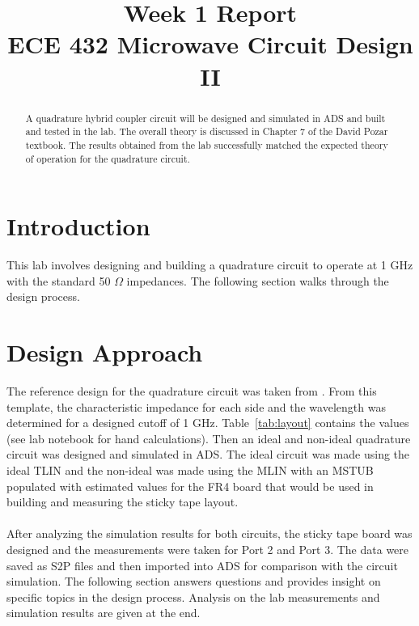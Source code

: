 \documentclass[conference]{IEEEtran}
\begin{document}
\title{Week 1 Report\\ECE 432 Microwave Circuit Design II}

\author{
\and
{}
}
\maketitle


\begin{abstract}
A quadrature hybrid coupler circuit will be designed and simulated in ADS and built and tested in the lab.  The overall theory is discussed in Chapter 7 of the David Pozar textbook.  The results obtained from the lab successfully matched the expected theory of operation for the quadrature circuit.
\end{abstract}
\IEEEpeerreviewmaketitle


\section{Introduction}
This lab involves designing and building a quadrature circuit to operate at 1 GHz with the standard 50 $\Omega$ impedances.  The following section walks through the design process.
\section{Design Approach}
The reference design for the quadrature circuit was taken from \cite{IEEEhowto:kopka}.  From this template, the characteristic impedance for each side and the wavelength was determined for a designed cutoff of 1 GHz.  Table~\ref{tab:layout} contains the values (see lab notebook for hand calculations).  Then an ideal and non-ideal quadrature circuit was designed and simulated in ADS.  The ideal circuit was made using the ideal TLIN and the non-ideal was made using the MLIN with an MSTUB populated with estimated values for the FR4 board that would be used in building and measuring the sticky tape layout.\\\\
After analyzing the simulation results for both circuits, the sticky tape board was designed and the measurements were taken for Port 2 and Port 3.  The data were saved as S2P files and then imported into ADS for comparison with the circuit simulation.  The following section answers questions and provides insight on specific topics in the design process.  Analysis on the lab measurements and simulation results are given at the end.
\end{document}
